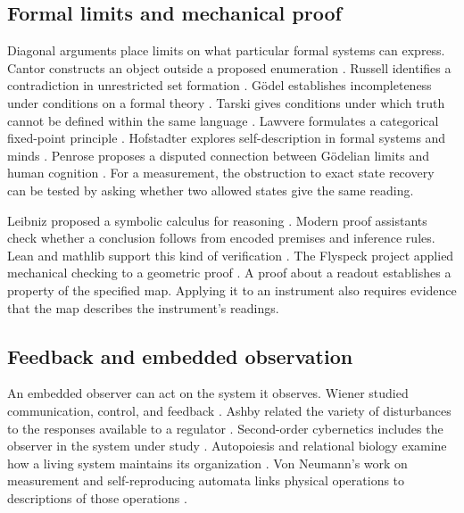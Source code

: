 \subsection{Formal limits and mechanical proof}

Diagonal arguments place limits on what particular formal systems can express. Cantor constructs an object outside a proposed enumeration \parencite{Cantor1891}. Russell identifies a contradiction in unrestricted set formation \parencite{Russell1908}. G\"odel establishes incompleteness under conditions on a formal theory \parencite{Godel1931}. Tarski gives conditions under which truth cannot be defined within the same language \parencite{Tarski1936}. Lawvere formulates a categorical fixed-point principle \parencite{Lawvere1969}. Hofstadter explores self-description in formal systems and minds \parencite{Hofstadter1979,Hofstadter2007}. Penrose proposes a disputed connection between G\"odelian limits and human cognition \parencite{Penrose1989,Penrose1994}. For a measurement, the obstruction to exact state recovery can be tested by asking whether two allowed states give the same reading.

Leibniz proposed a symbolic calculus for reasoning \parencite{Leibniz1989}. Modern proof assistants check whether a conclusion follows from encoded premises and inference rules. Lean and mathlib support this kind of verification \parencite{deMoura2015,Mathlib2020}. The Flyspeck project applied mechanical checking to a geometric proof \parencite{Hales2017}. A proof about a readout establishes a property of the specified map. Applying it to an instrument also requires evidence that the map describes the instrument's readings.

\subsection{Feedback and embedded observation}

An embedded observer can act on the system it observes. Wiener studied communication, control, and feedback \parencite{Wiener1948}. Ashby related the variety of disturbances to the responses available to a regulator \parencite{Ashby1956}. Second-order cybernetics includes the observer in the system under study \parencite{VonFoerster1981}. Autopoiesis and relational biology examine how a living system maintains its organization \parencite{MaturanaVarela1980,Rosen1991}. Von Neumann's work on measurement and self-reproducing automata links physical operations to descriptions of those operations \parencite{VonNeumann1955,VonNeumann1966}.

